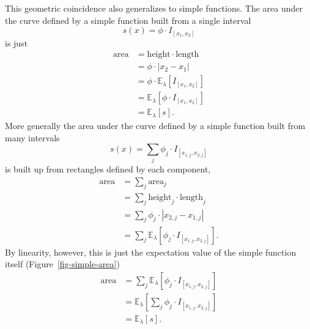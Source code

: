 \documentclass[
  letterpaper,
  DIV=11,
  numbers=noendperiod]{scrartcl}
\begin{document}
This geometric coincidence also generalizes to simple functions. The
area under the curve defined by a simple function built from a single
interval \[
s(x) = \phi \cdot I_{[x_{1}, x_{2}]}
\] is just \begin{align*}
\text{area}
&= \text{height} \cdot \text{length}
\\
&= \phi \cdot | x_{2} - x_{1} |
\\
&= \phi \cdot \mathbb{E}_{\lambda}[I_{[x_{1}, x_{2}]}]
\\
&= \mathbb{E}_{\lambda}[\phi \cdot I_{[x_{1}, x_{2}]}]
\\
&= \mathbb{E}_{\lambda}[s].
\end{align*} More generally the area under the curve defined by a simple
function built from many intervals \[
s(x) = \sum_{j} \phi_{j} \cdot I_{[x_{1, j}, x_{2, j}]}
\] is built up from rectangles defined by each component, \begin{align*}
\text{area}
&= \sum_{j} \text{area}_{j}
\\
&= \sum_{j} \text{height}_{j} \cdot \text{length}_{j}
\\
&= \sum_{j} \phi_{j} \cdot | x_{2, j} - x_{1, j} |
\\
&= \sum_{j} \mathbb{E}_{\lambda}[\phi_{j} \cdot I_{[x_{1, j}, x_{2, j}]}].
\end{align*} By linearity, however, this is just the expectation value
of the simple function itself (Figure~\ref{fig-simple-area})
\begin{align*}
\text{area}
&=
\sum_{j} \mathbb{E}_{\lambda}[\phi_{j} \cdot I_{[x_{1, j}, x_{2, j}]}]
\\
&=
\mathbb{E}_{\lambda}[\sum_{j} \phi_{j} \cdot I_{[x_{1, j}, x_{2, j}]}]
\\
&= \mathbb{E}_{\lambda}[s].
\end{align*}
\end{document}
